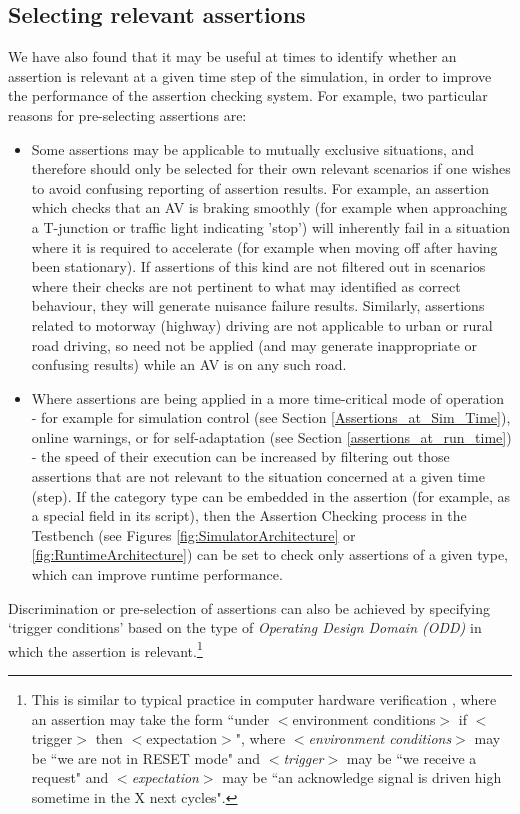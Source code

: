 \subsection{Selecting relevant assertions} \label{assertion_triggers}
We have also found that it may be useful at times to identify whether an assertion is relevant at a given time step of the simulation, in order to improve the performance of the assertion checking system. For example, two particular reasons for pre-selecting assertions are:
\begin{itemize}
    \item Some assertions may be applicable to mutually exclusive situations, and therefore should only be selected for their own  relevant scenarios if one wishes to avoid confusing reporting of assertion results. For example, an assertion which checks that an AV is braking smoothly (for example when approaching a T-junction or traffic light indicating 'stop') will inherently fail in a situation where it is required to accelerate (for example when moving off after having been stationary). If assertions of this kind are not filtered out in scenarios where their checks are not pertinent to what may identified as correct behaviour, they will generate nuisance failure results. Similarly, assertions related to motorway (highway) driving are not applicable to urban or rural road driving, so need not be applied (and may generate inappropriate or confusing results) while an AV is on any such road.
    \item Where assertions are being applied in a more time-critical mode of operation - for example for simulation control (see Section \ref{Assertions_at_Sim_Time}), online warnings, or for self-adaptation (see Section \ref{assertions_at_run_time}) - the speed of their execution can be increased by filtering out those assertions that are not relevant to the situation concerned at a given time (step). If the category type can be embedded in the assertion (for example, as a special field in its script), then the Assertion Checking process in the Testbench (see Figures \ref{fig:SimulatorArchitecture} or \ref{fig:RuntimeArchitecture}) can be set to check only assertions of a given type, which can improve runtime performance.
\end{itemize}

Discrimination or pre-selection of assertions can also be achieved by specifying `trigger conditions' based on the type of \textit{Operating Design Domain (ODD)} in which the assertion is relevant.\footnote{This is similar to typical practice in computer hardware verification \cite{tao2009}, where an assertion may take the form ``under $<$environment conditions$>$ if $<$trigger$>$ then $<$expectation$>$", where \textit{$<$environment conditions$>$} may be ``we are not in RESET mode" and \textit{$<$trigger$>$} may be ``we receive a request" and \textit{$<$expectation$>$}  may be ``an acknowledge signal is driven high sometime in the X next cycles".} 

